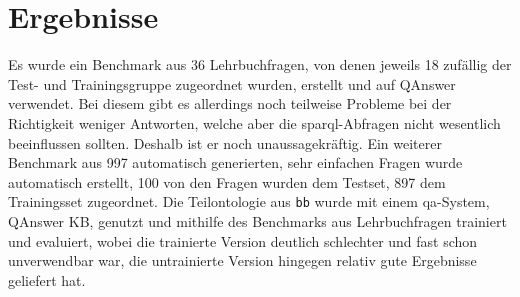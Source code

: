 \chapter{Ergebnisse}\label{ch:results}
Es wurde ein Benchmark aus 36 Lehrbuchfragen, von denen jeweils 18 zufällig der Test- und Trainingsgruppe zugeordnet wurden, erstellt und auf QAnswer verwendet.
Bei diesem gibt es allerdings noch teilweise Probleme bei der Richtigkeit weniger Antworten, welche aber die \ac{sparql}-Abfragen nicht wesentlich beeinflussen sollten.
Deshalb ist er noch unaussagekräftig.
Ein weiterer Benchmark aus 997 automatisch generierten, sehr einfachen Fragen wurde automatisch erstellt, 100 von den Fragen wurden dem Testset, 897 dem Trainingsset zugeordnet.
Die Teilontologie aus \texttt{bb} wurde mit einem \ac{qa}-System, QAnswer KB, genutzt und mithilfe des Benchmarks aus Lehrbuchfragen trainiert und evaluiert,
wobei die trainierte Version deutlich schlechter und fast schon unverwendbar war, die untrainierte Version hingegen relativ gute Ergebnisse geliefert hat.
